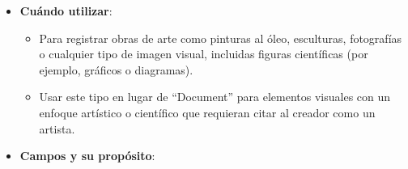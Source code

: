 \documentclass[
  jou,
  floatsintext,
  longtable,
  a4paper,
  nolmodern,
  notxfonts,
  notimes,
  colorlinks=true,linkcolor=blue,citecolor=blue,urlcolor=blue]{apa7}
\providecommand{\tightlist}{%
  \setlength{\itemsep}{0pt}\setlength{\parskip}{0pt}}
\begin{document}
\begin{itemize}
\tightlist
\item
  \textbf{Cuándo utilizar}:

  \begin{itemize}
  \tightlist
  \item
    Para registrar obras de arte como pinturas al óleo, esculturas,
    fotografías o cualquier tipo de imagen visual, incluidas figuras
    científicas (por ejemplo, gráficos o diagramas).
  \item
    Usar este tipo en lugar de ``Document'' para elementos visuales con
    un enfoque artístico o científico que requieran citar al creador
    como un artista.
  \end{itemize}
\item
  \textbf{Campos y su propósito}:


\end{itemize}
\end{document}
